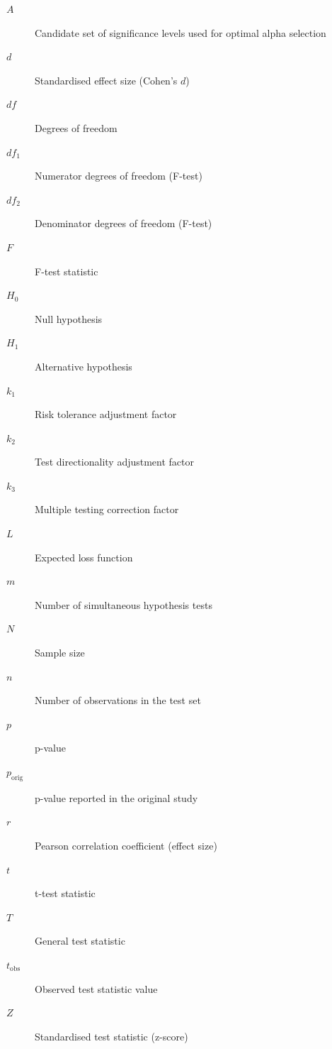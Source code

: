 \begin{description}
	
	\item[$A$] Candidate set of significance levels used for optimal alpha selection
	
	\item[$d$] Standardised effect size (Cohen's $d$)
	
	\item[$df$] Degrees of freedom
	
	\item[$df_1$] Numerator degrees of freedom (F-test)
	
	\item[$df_2$] Denominator degrees of freedom (F-test)
	
	\item[$F$] F-test statistic
	
	\item[$H_0$] Null hypothesis
	
	\item[$H_1$] Alternative hypothesis
	
	\item[$k_1$] Risk tolerance adjustment factor
	
	\item[$k_2$] Test directionality adjustment factor
	
	\item[$k_3$] Multiple testing correction factor
	
	\item[$L$] Expected loss function
	
	\item[$m$] Number of simultaneous hypothesis tests
	
	\item[$N$] Sample size
	
	\item[$n$] Number of observations in the test set
	
	\item[$p$] p-value
	
	\item[$p_{\text{orig}}$] p-value reported in the original study
	
	\item[$r$] Pearson correlation coefficient (effect size)
	
	\item[$t$] t-test statistic
	
	\item[$T$] General test statistic
	
	\item[$t_{\text{obs}}$] Observed test statistic value
	
	\item[$Z$] Standardised test statistic (z-score)
	
\end{description}

